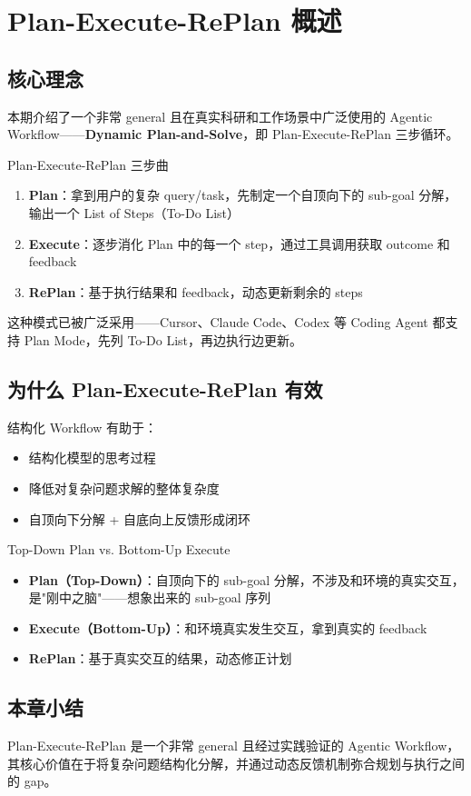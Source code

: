 \section{Plan-Execute-RePlan 概述}

\subsection{核心理念}

本期介绍了一个非常 general 且在真实科研和工作场景中广泛使用的 Agentic Workflow——\textbf{Dynamic Plan-and-Solve}，即 Plan-Execute-RePlan 三步循环。

\begin{importantbox}{Plan-Execute-RePlan 三步曲}
\begin{enumerate}
    \item \textbf{Plan}：拿到用户的复杂 query/task，先制定一个自顶向下的 sub-goal 分解，输出一个 List of Steps（To-Do List）
    \item \textbf{Execute}：逐步消化 Plan 中的每一个 step，通过工具调用获取 outcome 和 feedback
    \item \textbf{RePlan}：基于执行结果和 feedback，动态更新剩余的 steps
\end{enumerate}
\end{importantbox}

这种模式已被广泛采用——Cursor、Claude Code、Codex 等 Coding Agent 都支持 Plan Mode，先列 To-Do List，再边执行边更新。

\subsection{为什么 Plan-Execute-RePlan 有效}

结构化 Workflow 有助于：
\begin{itemize}
    \item 结构化模型的思考过程
    \item 降低对复杂问题求解的整体复杂度
    \item 自顶向下分解 + 自底向上反馈形成闭环
\end{itemize}

\begin{knowledgebox}{Top-Down Plan vs. Bottom-Up Execute}
\begin{itemize}
    \item \textbf{Plan（Top-Down）}：自顶向下的 sub-goal 分解，不涉及和环境的真实交互，是"刚中之脑"——想象出来的 sub-goal 序列
    \item \textbf{Execute（Bottom-Up）}：和环境真实发生交互，拿到真实的 feedback
    \item \textbf{RePlan}：基于真实交互的结果，动态修正计划
\end{itemize}
\end{knowledgebox}

\subsection{本章小结}

Plan-Execute-RePlan 是一个非常 general 且经过实践验证的 Agentic Workflow，其核心价值在于将复杂问题结构化分解，并通过动态反馈机制弥合规划与执行之间的 gap。

